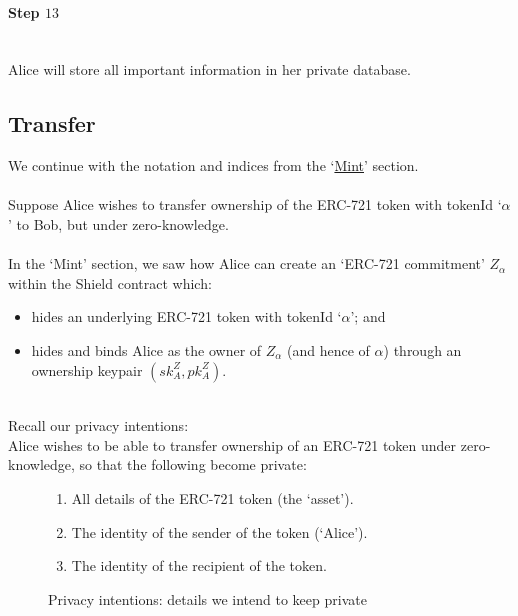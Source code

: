 \documentclass{article}
\begin{document}
\paragraph{Step $13$}
\ \\
Alice will store all important information in her private database.
















\newpage
\subsection{Transfer}
\label{sec:721Transfer}

\sectlof
We continue with the notation and indices from the `\hyperref[sec:Mint]{Mint}' section.\\
\\
Suppose Alice wishes to transfer ownership of the ERC-721 token with tokenId `$\alpha$' to Bob, but under zero-knowledge.\\
\\
In the `Mint' section, we saw how Alice can create an `ERC-721 commitment' $Z_\alpha$ within the Shield contract which:
\begin{itemize}
  \item hides an underlying ERC-721 token with tokenId `$\alpha$'; and
  \item hides and binds Alice as the owner of $Z_\alpha$ (and hence of $\alpha$) through an ownership keypair $(sk_A^Z, pk_A^Z)$.
\end{itemize}
\ \\
Recall our privacy intentions:\\
Alice wishes to be able to transfer ownership of an ERC-721 token under zero-knowledge, so that the following become private:

\begin{figure}[H]
	\begin{center}
		\begin{framed}
      \begin{enumerate}
        \item All details of the ERC-721 token (the `asset').
        \item The identity of the sender of the token (`Alice').
        \item The identity of the recipient of the token.
      \end{enumerate}
    \end{framed}
  \end{center}
  \caption{Privacy intentions: details we intend to keep private}
\end{figure}
\end{document}
